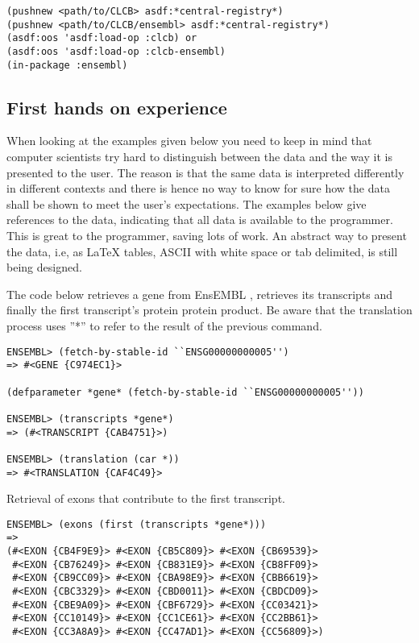 \documentclass{book}
\newcommand\ensembl{EnsEMBL }
\begin{document}
\lstset{language=lisp}
\begin{lstlisting}
(pushnew <path/to/CLCB> asdf:*central-registry*)
(pushnew <path/to/CLCB/ensembl> asdf:*central-registry*)
(asdf:oos 'asdf:load-op :clcb) or
(asdf:oos 'asdf:load-op :clcb-ensembl)
(in-package :ensembl)
\end{lstlisting}

\subsection{First hands on experience}

When looking at the examples given below you need to keep in mind that
computer scientists try hard to distinguish between the data and the
way it is presented to the user. The reason is that the same data
is interpreted differently in different contexts and there is hence
no way to know for sure how the data shall be shown to meet the user's
expectations. The examples below give references to the data, indicating
that all data is available to the programmer. This is great to the
programmer, saving lots of work. An abstract way to present the data,
i.e, as LaTeX tables, ASCII with white space or tab delimited, is still
being designed.

The code below retrieves a gene from \ensembl, retrieves its transcripts
and finally the first transcript's protein protein product. Be aware
that the translation process uses ''*'' to refer to the result of the
previous command.

\begin{lstlisting}
ENSEMBL> (fetch-by-stable-id ``ENSG00000000005'')
=> #<GENE {C974EC1}>

(defparameter *gene* (fetch-by-stable-id ``ENSG00000000005''))

ENSEMBL> (transcripts *gene*)
=> (#<TRANSCRIPT {CAB4751}>)

ENSEMBL> (translation (car *))
=> #<TRANSLATION {CAF4C49}>
\end{lstlisting}

Retrieval of exons that contribute to the first transcript.
\begin{lstlisting}
ENSEMBL> (exons (first (transcripts *gene*)))
=> 
(#<EXON {CB4F9E9}> #<EXON {CB5C809}> #<EXON {CB69539}>
 #<EXON {CB76249}> #<EXON {CB831E9}> #<EXON {CB8FF09}>
 #<EXON {CB9CC09}> #<EXON {CBA98E9}> #<EXON {CBB6619}>
 #<EXON {CBC3329}> #<EXON {CBD0011}> #<EXON {CBDCD09}>
 #<EXON {CBE9A09}> #<EXON {CBF6729}> #<EXON {CC03421}>
 #<EXON {CC10149}> #<EXON {CC1CE61}> #<EXON {CC2BB61}>
 #<EXON {CC3A8A9}> #<EXON {CC47AD1}> #<EXON {CC56809}>)
\end{lstlisting}
\end{document}
